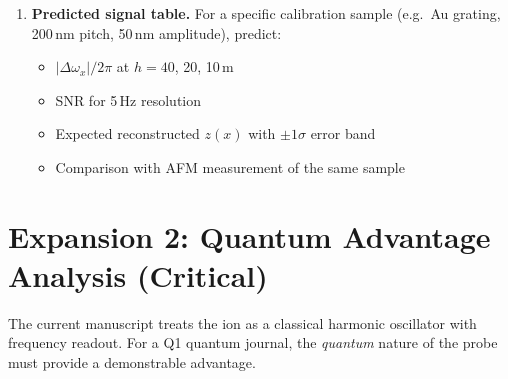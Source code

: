 \documentclass[11pt,a4paper]{article}
\begin{document}
\begin{enumerate}[label=\textbf{E\arabic*}, leftmargin=*]
    \item \textbf{Predicted signal table.} For a specific calibration sample (e.g.\ Au grating, 200\,nm pitch, 50\,nm amplitude), predict:
    \begin{itemize}
        \item $|\Delta\omega_x|/2\pi$ at $h = 40$, 20, 10\,\textmu m
        \item SNR for 5\,Hz resolution
        \item Expected reconstructed $z(x)$ with $\pm 1\sigma$ error band
        \item Comparison with AFM measurement of the same sample
    \end{itemize}
\end{enumerate}

\section{Expansion 2: Quantum Advantage Analysis (Critical)}

The current manuscript treats the ion as a classical harmonic oscillator with frequency readout. For a Q1 quantum journal, the \emph{quantum} nature of the probe must provide a demonstrable advantage.
\end{document}
